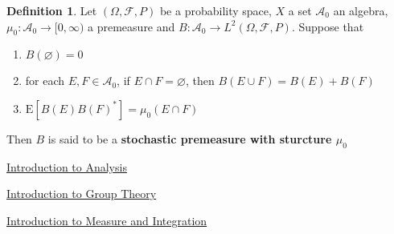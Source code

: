 \documentclass[12pt]{amsart}
\theoremstyle{definition}
\newtheorem{defn}[definition]{Definition}
\newcommand{\Om}{\Omega}
\newcommand{\MA}{\mathcal{A}}
\newcommand{\MF}{\mathcal{F}}
\newcommand{\E}{\text{E}}
\newcommand{\Rg}{[0,\infty)}
\begin{document}
	\begin{defn}
	Let $(\Om, \MF, P)$ be a probability space, $X$ a set $\MA_0$ an algebra, $\mu_0:\MA_0 \rightarrow \Rg$ a premeasure and $B:\MA_0 \rightarrow L^2(\Om, \MF, P)$. 
	Suppose that 
	\begin{enumerate}
	\item $B(\varnothing) = 0$
	\item for each $E, F \in \MA_0$, if $E \cap F = \varnothing$, then $B(E \cup F) = B(E) + B(F)$
	\item $\E [B(E)B(F)^*] = \mu_0(E \cap F)$
	\end{enumerate}
	Then $B$ is said to be a \textbf{stochastic premeasure with sturcture $\mu_0$}
	
	\end{defn}
	






	
	
	
	
	
	\newpage
	\begin{thebibliography}{4}
  \href{https://github.com/carsonaj/Mathematics/blob/master/Introduction\%20to\%20Analysis/Introduction\%20to\%20Analysis.pdf}{Introduction to Analysis}	
	
 \href{https://github.com/carsonaj/Mathematics/tree/master/Introduction\%20to\%20Group\%20Theory}{Introduction to Group Theory}

  \href{https://github.com/carsonaj/Mathematics/blob/master/Introduction\%20to\%20Measure\%20and\%20Integration/Introduction\%20to\%20Measure\%20and\%20Integration.pdf}{Introduction to Measure and Integration}


\end{thebibliography}
	
	
\end{document}
